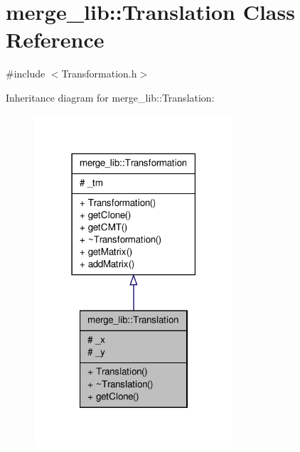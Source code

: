 \hypertarget{classmerge__lib_1_1_translation}{\section{merge\-\_\-lib\-:\-:Translation Class Reference}
\label{d8/d1d/classmerge__lib_1_1_translation}
}


{\ttfamily \#include $<$Transformation.\-h$>$}



Inheritance diagram for merge\-\_\-lib\-:\-:Translation\-:
\nopagebreak
\begin{figure}[H]
\begin{center}
\leavevmode
\includegraphics[width=210pt]{d0/d11/classmerge__lib_1_1_translation__inherit__graph}
\end{center}
\end{figure}


